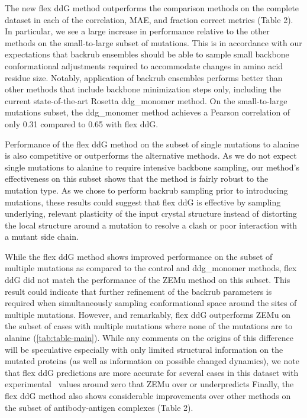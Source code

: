 The new flex ddG method outperforms the comparison methods on the complete dataset in each of the correlation, MAE, and fraction correct metrics (Table 2). In particular, we see a large increase in performance relative to the other methods on the small-to-large subset of mutations. This is in accordance with our expectations that backrub ensembles should be able to sample small backbone conformational adjustments required to accommodate changes in amino acid residue size. Notably, application of backrub ensembles performs better than other methods that include backbone minimization steps only, including the current state-of-the-art Rosetta ddg\_monomer method. On the small-to-large mutations subset, the ddg\_monomer method achieves a Pearson correlation of only 0.31 compared to 0.65 with flex ddG.

Performance of the flex ddG method on the subset of single mutations to alanine is also competitive or outperforms the alternative methods.
As we do not expect single mutations to alanine to require intensive backbone sampling, our method's effectiveness on this subset shows that the method is fairly robust to the mutation type.
As we chose to perform backrub sampling prior to introducing mutations, these results could suggest that flex ddG is effective by sampling underlying, relevant plasticity of the input crystal structure instead of distorting the local structure around a mutation to resolve a clash or poor interaction with a mutant side chain.

While the flex ddG method shows improved performance on the subset of multiple mutations as compared to the control and ddg\_monomer methods, flex ddG did not match the performance of the ZEMu method on this subset.
This result could indicate that further refinement of the backrub parameters is required when simultaneously sampling conformational space around the sites of multiple mutations.
However, and remarkably, flex ddG outperforms ZEMu on the subset of cases with multiple mutations where none of the mutations are to alanine (\cref{tab:table-main}).
While any comments on the origins of this difference will be speculative especially with only limited structural information on the mutated proteins (as well as information on possible changed dynamics), we note that flex ddG predictions are more accurate for several cases in this dataset with experimental \ddg\ values around zero that ZEMu over or underpredicts
Finally, the flex ddG method also shows considerable improvements over other methods on the subset of antibody-antigen complexes (Table 2).

